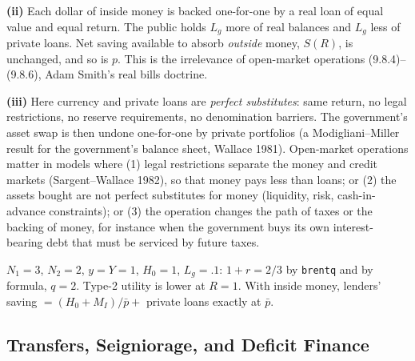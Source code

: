 \documentclass[12pt, letterpaper]{article}
\begin{document}
\begin{tcolorbox}[evenbox,title={Exercise 9.8 \quad Inside money and real bills}]
\textbf{(ii)} Each dollar of inside money is backed one-for-one by a real loan of equal value and
equal return. The public holds $L_g$ more of real balances and $L_g$ less of private loans. Net
saving available to absorb \emph{outside} money, $S(R)$, is unchanged, and so is $p$. This is the
irrelevance of open-market operations (9.8.4)--(9.8.6), Adam Smith's real bills doctrine.

\textbf{(iii)} Here currency and private loans are \emph{perfect substitutes}: same return, no legal
restrictions, no reserve requirements, no denomination barriers. The government's asset swap is then
undone one-for-one by private portfolios (a Modigliani--Miller result for the government's balance
sheet, Wallace 1981). Open-market operations matter in models where (1) legal restrictions separate
the money and credit markets (Sargent--Wallace 1982), so that money pays less than loans; or (2) the
assets bought are not perfect substitutes for money (liquidity, risk, cash-in-advance constraints);
or (3) the operation changes the path of taxes or the backing of money, for instance when the
government buys its own interest-bearing debt that must be serviced by future taxes.

\begin{tcolorbox}[databox]
$N_1=3$, $N_2=2$, $y=Y=1$, $H_0=1$, $L_g=.1$: $1+r=2/3$ by \texttt{brentq} and by formula, $q=2$.
Type-2 utility is lower at $R=1$. With inside money, lenders' saving
$=(H_0+M_I)/\bar p+$ private loans exactly at $\bar p$.
\end{tcolorbox}
\end{tcolorbox}

\subsection{Transfers, Seigniorage, and Deficit Finance}
\end{document}
